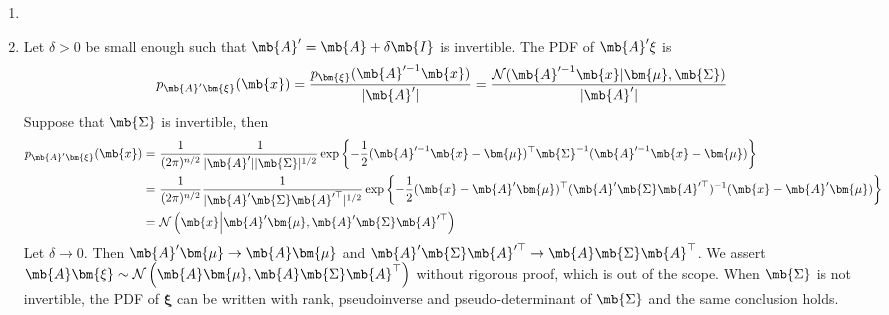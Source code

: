 \begin{exercise}
\begin{enumerate}
            \begin{solution}
                \begin{enumerate}
                    \item []
                    \item Let $\delta>0$ be small enough such that $\mb{A}' = \mb{A} + \delta\mb{I}$ is invertible. The PDF of $\mb{A}'\xi$ is
                        \begin{align*}
                            p_{\mb{A}'\bm{\xi}}(\mb{x})=\frac{p_{\bm{\xi}}(\mb{A}'^{-1}\mb{x})}{|\mb{A}'|}=\frac{\mathcal{N}(\mb{A}'^{-1}\mb{x}|\bm{\mu},\mb{\Sigma})}{|\mb{A}'|}
                        \end{align*}
                        Suppose that $\mb{\Sigma}$ is invertible, then
                        \begin{align*}
                            p_{\mb{A}'\bm{\xi}}(\mb{x})=\  & \frac{1}{(2\pi)^{n/2}}\frac{1}{|\mb{A}'||\mb{\Sigma}|^{1/2}}\exp\left\{-\frac{1}{2}(\mb{A}'^{-1}\mb{x}-\bm{\mu})^{\top}\mb{\Sigma}^{-1}(\mb{A}'^{-1}\mb{x}-\bm{\mu})\right\}                      \\
                            =\                             & \frac{1}{(2\pi)^{n/2}}\frac{1}{|\mb{A}'\mb{\Sigma}\mb{A}'^\top|^{1/2}}\exp\left\{-\frac{1}{2}(\mb{x}-\mb{A}'\bm{\mu})^{\top}(\mb{A}'\mb{\Sigma}\mb{A}'^\top)^{-1}(\mb{x}-\mb{A}'\bm{\mu})\right\} \\
                            =\                             & \mathcal{N}\left(\mb{x}\Big|\mb{A}'\bm{\mu},\mb{A}'\mb{\Sigma}\mb{A}'^{\top}\right)
                        \end{align*}
                        Let $\delta \to 0$. Then $\mb{A}'\bm{\mu} \to\mb{A}\bm{\mu}$ and $\mb{A}'\mb{\Sigma}\mb{A}'^{\top}\to\mb{A}\mb{\Sigma}\mb{A}^{\top}$. We assert $\mb{A}\bm{\xi} \sim \mathcal{N}\left(\mb{A} \bm{\mu},\mb{A} \mb{\Sigma} \mb{A}^{\top}\right)$ without rigorous proof, which is out of the scope. When $\mb{\Sigma}$ is not invertible, the PDF of $\bm{\xi}$ can be written with rank, pseudoinverse and pseudo-determinant of $\mb{\Sigma}$ and the same conclusion holds.
                        

\end{enumerate}
\end{solution}
\end{enumerate}
\end{exercise}
